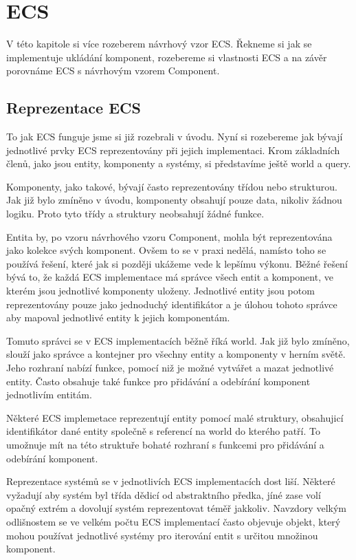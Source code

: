 \chapter{ECS}
\label{chap:ecs}
V této kapitole si více rozeberem návrhový vzor ECS. Řekneme si jak se implementuje ukládání komponent, rozebereme si vlastnosti ECS a na závěr porovnáme ECS s návrhovým vzorem Component.

\section{Reprezentace ECS}
To jak ECS funguje jsme si již rozebrali v úvodu. Nyní si rozebereme jak bývají jednotlivé prvky ECS reprezentovány při jejich implementaci. Krom základních členů, jako jsou entity, komponenty a systémy, si představíme ještě world a query.

Komponenty, jako takové, bývají často reprezentovány třídou nebo strukturou. Jak již bylo zmíněno v úvodu, komponenty obsahují pouze data, nikoliv žádnou logiku. Proto tyto třídy a struktury neobsahují žádné funkce.

Entita by, po vzoru návrhového vzoru Component, mohla být reprezentována jako kolekce svých komponent. Ovšem to se v praxi nedělá, namísto toho se používá řešení, které jak si později ukážeme vede k lepšímu výkonu. Běžné řešení bývá to, že každá ECS implementace má správce všech entit a komponent, ve kterém jsou jednotlivé komponenty uloženy. Jednotlivé entity jsou potom reprezentovány pouze jako jednoduchý identifikátor a je úlohou tohoto správce aby mapoval jednotlivé entity k jejich komponentám.

Tomuto správci se v ECS implementacích běžně říká world. Jak již bylo zmíněno, slouží jako správce a kontejner pro všechny entity a komponenty v herním světě. Jeho rozhraní nabízí funkce, pomocí niž je možné vytvářet a mazat jednotlivé entity. Často obsahuje také funkce pro přidávání a odebírání komponent jednotlivím entitám.

Některé ECS implemetace reprezentují entity pomocí malé struktury, obsahujicí identifikátor dané entity společně s referencí na world do kterého patří. To umožnuje mít na této struktuře bohaté rozhraní s funkcemi pro přidávání a odebírání komponent.

Reprezentace systémů se v jednotlivích ECS implementacích dost liší. Některé vyžadují aby systém byl třída dědicí od abstraktního předka, jíné zase volí opačný extrém a dovolují systém reprezentovat téměř jakkoliv. Navzdory velkým odlišnostem se ve velkém počtu ECS implementací často objevuje objekt, který mohou používat jednotlivé systémy pro iterování entit s určitou množinou komponent.

